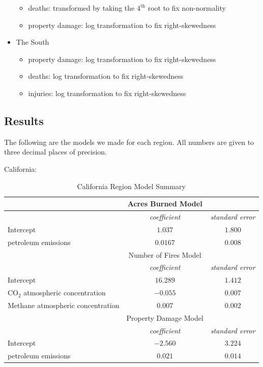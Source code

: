 \documentclass[10pt,]{article}
\begin{document}
\begin{itemize}
\begin{itemize}
\begin{itemize}
    \end{itemize}
    \item deaths: transformed by taking the $4^{\text{th}}$ root to fix non-normality
    \item property damage: log transformation to fix right-skewedness
  \end{itemize}
  \item The South
  \begin{itemize}
    \item property damage: log transformation to fix right-skewedness
    \item deaths: log transformation to fix right-skewedness
    \item injuries: log transformation to fix right-skewedness
  \end{itemize}
\end{itemize}

\subsection{Results}\label{results}

The following are the models we made for each region. All numbers are
given to three decimal places of precision.

California:

\begin{center}
  \begin{table}[H]
  \caption{\label{tab:table-name}California Region Model Summary}
  \smallskip
  \begin{center}
  \begin{tabular}{|l c c|}
  \hline
   & Acres Burned Model & \\
  \hline\hline
   & \textit{coefficient} & \textit{standard error} \\ [0.5ex] 
  \hline
  Intercept & $1.037$ & $1.800$ \\ 
  \hline
  petroleum emissions & $0.0167$ & $0.008$ \\
  \hline\hline
   & Number of Fires Model & \\
  \hline\hline
   & \textit{coefficient} & \textit{standard error} \\ [0.5ex] 
  \hline
  Intercept & $16.289$ & $1.412$ \\ 
  \hline
  CO$_2$ atmospheric concentration & $-0.055$ & $0.007$ \\
  \hline
  Methane atmospheric concentration & $0.007$ & $0.002$ \\
  \hline\hline
   & Property Damage Model & \\
  \hline\hline
   & \textit{coefficient} & \textit{standard error} \\ [0.5ex] 
  \hline
  Intercept & $-2.560$ & $3.224$ \\ 
  \hline
  petroleum emissions & $0.021$ & $0.014$ \\
  \hline
  \end{tabular}
  \end{center}
  \end{table}
\end{center}
\end{document}
